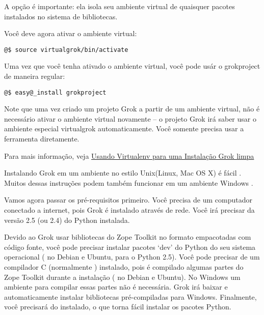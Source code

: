 \documentclass[a4paper,12pt,portuguese]{manual}
\begin{document}
{\begin{minipage}{0.95\textwidth}
A opção  é importante: ela isola seu ambiente
virtual de quaisquer pacotes instalados no sistema de bibliotecas.

Você deve agora ativar o ambiente virtual:

\begin{Verbatim}[commandchars=@\[\]]
@$ source virtualgrok/bin/activate
\end{Verbatim}

Uma vez que você tenha ativado o ambiente virtual, você pode usár
o  grokproject de maneira regular:

\begin{Verbatim}[commandchars=@\[\]]
@$ easy@_install grokproject
\end{Verbatim}

Note que uma vez criado um projeto Grok a partir de um ambiente
virtual, não é necessário ativar o ambiente virtual novamente -- o
projeto Grok irá saber usar o ambiente especial virtualgrok
automaticamente. Você somente precisa usar a ferramenta
 diretamente.

Para mais informação, veja \href{http://grok.zope.org/documentation/how-to/using-virtualenv-for-a-clean-grok-installation}{Usando Virtualenv para uma Instalação
Grok limpa}
\end{minipage}}
\begin{center}\setlength{\fboxsep}{5pt}\end{center}

Instalando Grok em um ambiente no estilo Unix(Linux, Mac OS X) é fácil
. Muitos dessas instruções podem também funcionar em um ambiente
Windows .

Vamos agora passar os pré-requisitos primeiro. Você precisa de um
computador conectado a internet, pois Grok é instalado através de rede.
Você irá precisar da versão 2.5 (ou 2.4) do Python instalada.

Devido ao Grok usar bibliotecas do Zope Toolkit no formato empacotadas
com código fonte, você pode precisar instalar pacotes `dev' do Python
do seu sistema operacional ( no Debian e Ubuntu,
 para o Python 2.5). Você pode precisar de um
compilador C (normalmente ) instalado, pois é compilado algumas
partes do Zope Toolkit durante a instalação ( no
Debian e Ubuntu). No Windows um ambiente para compilar essas partes
não é necessária. Grok irá baixar e automaticamente instalar
bibliotecas pré-compiladas para Windows. Finalmente, você precisará do
 instalado, o que torna fácil instalar os pacotes Python.
\end{document}
